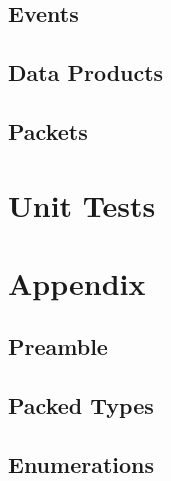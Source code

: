 

\subsection{Events}



\subsection{Data Products}



\subsection{Packets}



\section{Unit Tests}



\section{Appendix}

\subsection{Preamble}



\subsection{Packed Types}



\subsection{Enumerations}




